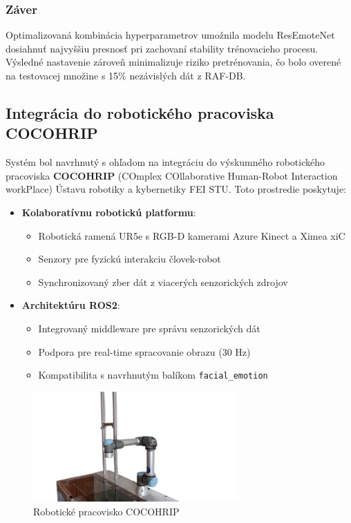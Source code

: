 \subsubsection{Záver}

Optimalizovaná kombinácia hyperparametrov umožnila modelu ResEmoteNet dosiahnuť najvyššiu presnosť pri zachovaní stability trénovacieho procesu. Výsledné nastavenie zároveň minimalizuje riziko pretrénovania, čo bolo overené na testovacej množine s 15\% nezávislých dát z RAF-DB.

\subsection{Integrácia do robotického pracoviska COCOHRIP}
Systém bol navrhnutý s ohľadom na integráciu do výskumného robotického pracoviska \textbf{COCOHRIP} (COmplex COllaborative Human-Robot Interaction workPlace) Ústavu robotiky a kybernetiky FEI STU. Toto prostredie poskytuje:

\begin{itemize}
\item \textbf{Kolaboratívnu robotickú platformu}: 
\begin{itemize}
\item Robotická ramená UR5e s RGB-D kamerami Azure Kinect a Ximea xiC
\item Senzory pre fyzickú interakciu človek-robot 
\item Synchronizovaný zber dát z viacerých senzorických zdrojov
\end{itemize}

\item \textbf{Architektúru ROS2}: 
\begin{itemize}
\item Integrovaný middleware pre správu senzorických dát
\item Podpora pre real-time spracovanie obrazu (30 Hz)
\item Kompatibilita s navrhnutým balíkom \texttt{facial\_emotion}
\end{itemize}
\end{itemize}

\begin{figure}[h]
\centering
\includegraphics[width=0.7\textwidth]{img/cocohrip.png}
\caption{Robotické pracovisko COCOHRIP}
\end{figure}

